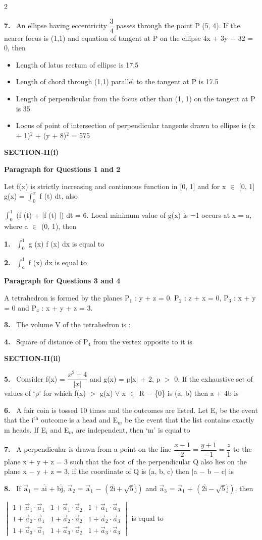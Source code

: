 \documentclass[10pt]{extarticle}
\newcommand{\sect}[1]{\par\smallskip\noindent\textbf{#1}\par}
\newcommand{\qn}[1]{\par\smallskip\noindent\textbf{#1.}~}
\newcommand{\paraq}[2]{\par\smallskip\noindent\textbf{Paragraph for Questions #1 and #2}\par}
\newenvironment{qoptions}{\begin{itemize}[leftmargin=1.8em,itemsep=1pt,topsep=2pt,label={}]}{\end{itemize}}
\newcommand{\opt}[2]{\item[(#1)] #2}
\begin{document}
\begin{multicols}{2}
\qn{7} An ellipse having eccentricity $\dfrac34$ passes through the point P (5, 4). If the nearer focus is (1,1) and equation of tangent at P on the ellipse 4x + 3y $-$ 32 = 0, then
\begin{qoptions}
\opt{A}{Length of latus rectum of ellipse is 17.5}
\opt{B}{Length of chord through (1,1) parallel to the tangent at P is 17.5}
\opt{C}{Length of perpendicular from the focus other than (1, 1) on the tangent at P is 35}
\opt{D}{Locus of point of intersection of perpendicular tangents drawn to ellipse is (x + 1)$^2$ + (y + 8)$^2$ = 575}
\end{qoptions}
\sect{SECTION-II(i)}
\paraq{1}{2}
Let f(x) is strictly increasing and continuous function in [0, 1] and for x $\in$ [0, 1] g(x) = $\displaystyle\int_0^x$ f (t) dt, also\par
$\displaystyle\int_0^1$ (f (t) + $|$f (t) $|$) dt = 6. Local minimum value of g(x) is $-$1 occurs at x = a, where a $\in$ (0, 1), then
\qn{1} $\displaystyle\int_0^1$ g (x) f (x) dx is equal to
\qn{2} $\displaystyle\int_a^1$ f (x) dx is equal to
\paraq{3}{4}
A tetrahedron is formed by the planes P$_1$ : y + z = 0. P$_2$ : z + x = 0, P$_3$ : x + y = 0 and P$_4$ : x + y + z = 3.
\qn{3} The volume V of the tetrahedron is :
\qn{4} Square of distance of P$_4$ from the vertex opposite to it is
\sect{SECTION-II(ii)}
\qn{5} Consider f(x) = $\dfrac{x^2+4}{|x|}$ and g(x) = p$|$x$|$ + 2, p $>$ 0. If the exhaustive set of values of `p' for which f(x) $>$ g(x) $\forall$ x $\in$ R $-$ \{0\} is (a, b) then a + 4b is
\qn{6} A fair coin is tossed 10 times and the outcomes are listed. Let E$_i$ be the event that the i$^{\mathrm{th}}$ outcome is a head and E$_m$ be the event that the list contains exactly m heads. If E$_i$ and E$_m$ are independent, then `m' is equal to
\qn{7} A perpendicular is drawn from a point on the line $\dfrac{x-1}2=\dfrac{y+1}{-1}=\dfrac z1$ to the plane x + y + z = 3 such that the foot of the perpendicular Q also lies on the plane x $-$ y + z = 3, if the coordinate of Q is (a, b, c) then $|$a $-$ b $-$ c$|$ is
\qn{8} If $\vec{\mathrm a}_1$ = a$\hat{\mathrm i}$ + b$\hat{\mathrm j}$, $\vec{\mathrm a}_2$ = $\vec{\mathrm a}_1$ $-$ $\left(2\hat{\mathrm i}+\sqrt5\hat{\mathrm j}\right)$ and $\vec{\mathrm a}_3$ = $\vec{\mathrm a}_1$ + $\left(2\hat{\mathrm i}-\sqrt5\hat{\mathrm j}\right)$, then\par
$\begin{vmatrix}1+\vec a_1\cdot\vec a_1&1+\vec a_1\cdot\vec a_2&1+\vec a_1\cdot\vec a_3\\1+\vec a_2\cdot\vec a_1&1+\vec a_2\cdot\vec a_2&1+\vec a_2\cdot\vec a_3\\1+\vec a_3\cdot\vec a_1&1+\vec a_3\cdot\vec a_2&1+\vec a_3\cdot\vec a_3\end{vmatrix}$ is equal to

\end{multicols}
\end{document}

